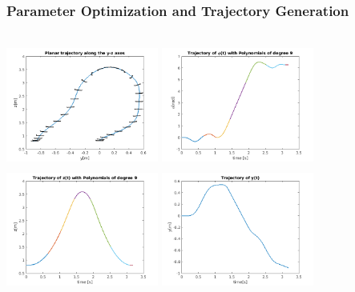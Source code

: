 \documentclass{thesisbeamer}
\newcommand\Fontvi{\fontsize{9}{10}\selectfont}
\begin{document}
\begin{frame}
	\frametitle{Parameter Optimization and Trajectory Generation}
	\Fontvi
	
	\begin{columns}[t]
		\centering
			\includegraphics[width=5cm,height=4cm]{Images/optimization/trajectory.png}
			\includegraphics[width=5cm,height=4cm]{Images/optimization/phi.png}
			\centering
			\includegraphics[width=5cm,height=4cm]{Images/optimization/z.png}
			\includegraphics[width=5cm,height=4cm]{Images/optimization/y.png}
	\end{columns}
	
\end{frame}
\end{document}
